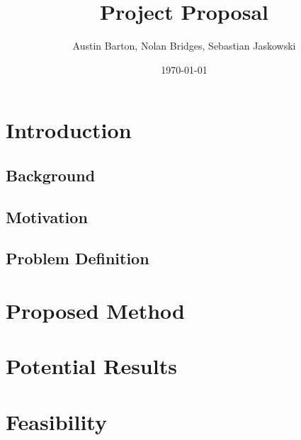 \documentclass[11pt,a4paper]{article}
\title{Project Proposal}
\author{Austin Barton, Nolan Bridges, Sebastian Jaskowski}
\date{\today}
\begin{document}
\maketitle

\section{Introduction}

\subsection{Background}

\subsection{Motivation}

\subsection{Problem Definition}

\section{Proposed Method}

\section{Potential Results}

\section{Feasibility}
\end{document}
